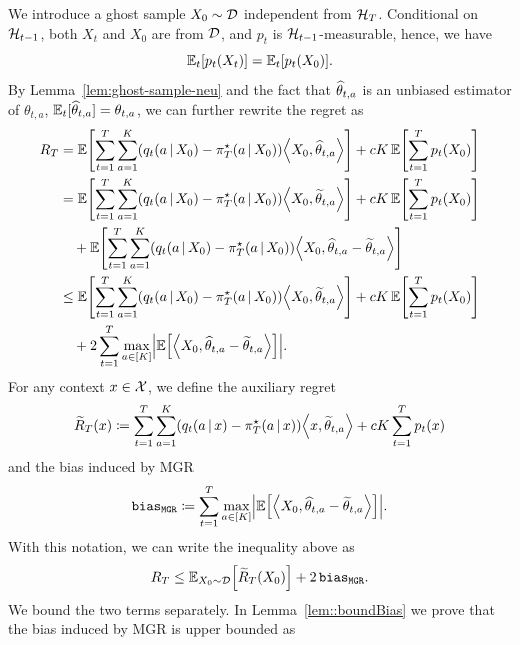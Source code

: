 We introduce a ghost sample $X_0 \sim \mathcal{D}$ independent from $\mathcal{H}_T$. Conditional on $\mathcal{H}_{t-1}$, both $X_t$ and $X_0$ are \iid from $\mathcal{D}$, and $p_t$ is $\mathcal{H}_{t-1}$-measurable, hence, we have
%
\begin{equation*}
    \bbE_t \sbr*{p_t \spr*{X_t}} = \bbE_t \sbr*{p_t \spr*{X_0}}.
\end{equation*}
%
By Lemma~\ref{lem:ghost-sample-neu} and the fact that $\widehat{\theta}_{t, a}$ is an unbiased estimator of $\theta_{t, a}$, \ie $\mathbb{E}_t [\widehat{\theta}_{t, a}] = \theta_{t, a}$, we can further rewrite the regret as 
%
\begin{align*}
    R_T &= \bbE \sbr*{\sumtT \sumaK \spr*{q_t \spr*{a \given X_0} - \pi_T^\star \spr*{a \given X_0}} \inp*{X_0, \wh{\theta}_{t, a}}} + c K\,\bbE \sbr*{\sumtT p_t \spr*{X_0}}\\
    &= \bbE \sbr*{\sumtT \sumaK \spr*{q_t \spr*{a \given X_0} - \pi_T^\star \spr*{a \given X_0}} \inp*{X_0, \wt{\theta}_{t, a}}} + c K\,\bbE \sbr*{\sumtT p_t \spr*{X_0}}\\
    &\quad+ \bbE \sbr*{\sumtT \sumaK \spr*{q_t \spr*{a \given X_0} - \pi_T^\star \spr*{a \given X_0}} \inp*{X_0, \wh{\theta}_{t, a} - \wt{\theta}_{t, a}}}\\
    &\leq \bbE \sbr*{\sumtT \sumaK \spr*{q_t \spr*{a \given X_0} - \pi_T^\star \spr*{a \given X_0}} \inp*{X_0, \wt{\theta}_{t, a}}} + c K\,\bbE \sbr*{\sumtT p_t \spr*{X_0}}\\
    &\quad+ 2 \sumtT \max_{a \in \sbr*{K}} \abs*{\bbE \sbr*{\inp*{X_0, \wh{\theta}_{t, a} - \wt{\theta}_{t, a}}}}.
\end{align*}
%
For any context $x \in \mathcal{X}$, we define the auxiliary regret
%
\begin{equation*}
    \wt R_T \spr*{x} \coloneqq \sumtT \sumaK \spr*{q_t \spr*{a \given x} - \pi_T^\star \spr*{a \given x}} \inp*{x, \wt{\theta}_{t, a}} + c K \sumtT p_t \spr*{x}
\end{equation*}
%
and the bias induced by MGR
%
\begin{equation*}
    \biasmgr \coloneqq \sumtT \max_{a \in \sbr*{K}} \abs*{\bbE \sbr*{\inp*{X_0, \wh{\theta}_{t, a} - \wt{\theta}_{t, a}}}}.
\end{equation*}
%
With this notation, we can write the inequality above as
%
\begin{equation*}
    R_T \leq \bbE_{X_0 \sim \cD} \sbr*{\wt R_T \spr*{X_0}} + 2\,\biasmgr.
\end{equation*}
%
We bound the two terms separately. In Lemma~\ref{lem::boundBias} we prove that the bias induced by MGR is upper bounded as
